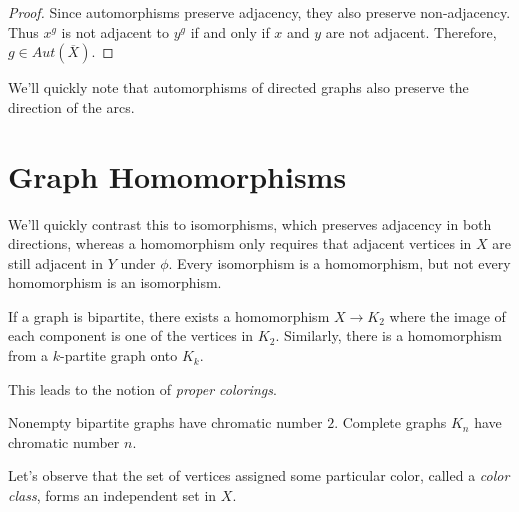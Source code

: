 
\begin{proof}
	Since automorphisms preserve adjacency, they also preserve non-adjacency.  Thus $x^g$ is not adjacent to $y^g$ if and only if $x$ and $y$ are not adjacent.  Therefore, $g\in Aut(\overline{X})$.
\end{proof}

We'll quickly note that automorphisms of directed graphs also preserve the direction of the arcs.


\section*{Graph Homomorphisms}

We'll quickly contrast this to isomorphisms, which preserves adjacency in both directions, whereas a homomorphism only requires that adjacent vertices in $X$ are still adjacent in $Y$ under $\phi$.  Every isomorphism is a homomorphism, but not every homomorphism is an isomorphism.


If a graph is bipartite, there exists a homomorphism $X\rightarrow K_2$ where the image of each component is one of the vertices in $K_2$.  Similarly, there is a homomorphism from a $k$-partite graph onto $K_k$.

This leads to the notion of \textit{proper colorings}.



Nonempty bipartite graphs have chromatic number $2$.  Complete graphs $K_n$ have chromatic number $n$.

Let's observe that the set of vertices assigned some particular color, called a \textit{color class}, forms an independent set in $X$.

